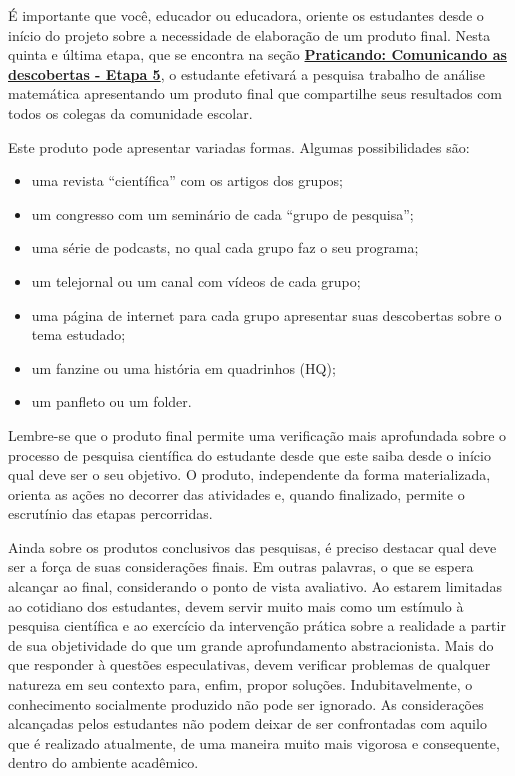 \begin{apresentacao}
É importante que você, educador ou educadora, oriente os estudantes desde o início do projeto sobre a necessidade de elaboração de um produto final. Nesta quinta e última etapa, que se encontra na seção \hyperref[etapa5]{\textcolor{session2}{\textbf{Praticando: Comunicando as descobertas - Etapa 5}}}, o estudante efetivará a pesquisa trabalho de análise matemática apresentando um produto final que compartilhe seus resultados com todos os colegas da comunidade escolar.

Este produto pode apresentar variadas formas. Algumas possibilidades são:
\begin{itemize}
\item uma revista “científica” com os artigos dos grupos;
\item um congresso com um seminário de cada “grupo de pesquisa”;
\item uma série de podcasts, no qual cada grupo faz o seu programa;
\item um telejornal ou um canal com vídeos de cada grupo;
\item uma página de internet para cada grupo apresentar suas descobertas sobre o tema estudado;
\item um fanzine ou uma história em quadrinhos (HQ);
\item um panfleto ou um folder.
\end{itemize}

Lembre-se que o produto final permite uma verificação mais aprofundada sobre o processo de pesquisa científica do estudante desde que este saiba desde o início qual deve ser o seu objetivo. O produto, independente da forma materializada, orienta as ações no decorrer das atividades e, quando finalizado, permite o escrutínio das etapas percorridas.

Ainda sobre os produtos conclusivos das pesquisas, é preciso destacar qual deve ser a força de suas considerações finais. Em outras palavras, o que se espera alcançar ao final, considerando o ponto de vista avaliativo. Ao estarem limitadas ao cotidiano dos estudantes, devem servir muito mais como um estímulo à pesquisa científica e ao exercício da intervenção prática sobre a realidade a partir de sua objetividade do que um grande aprofundamento abstracionista. Mais do que responder à questões especulativas, devem verificar problemas de qualquer natureza em seu contexto para, enfim, propor soluções. Indubitavelmente, o conhecimento socialmente produzido não pode ser ignorado. As considerações alcançadas pelos estudantes não podem deixar de ser confrontadas com aquilo que é realizado atualmente, de uma maneira muito mais vigorosa e consequente, dentro do ambiente acadêmico.


\end{apresentacao}
